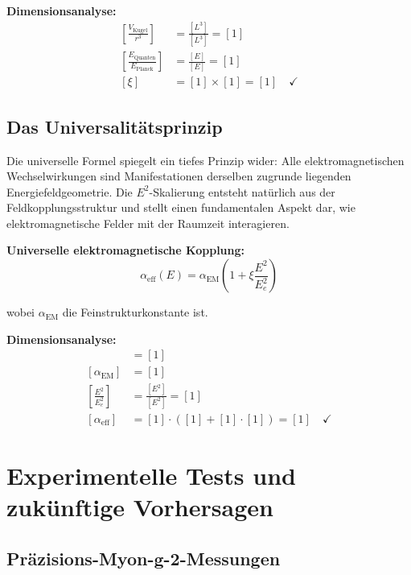 \documentclass[12pt,a4paper]{report}
\begin{document}
	\textbf{Dimensionsanalyse:}
	\begin{align}
		\left[\frac{V_{\text{Kugel}}}{r^3}\right] &= \frac{[L^3]}{[L^3]} = [1] \\
		\left[\frac{E_{\text{Quanten}}}{E_{\text{Planck}}}\right] &= \frac{[E]}{[E]} = [1] \\
		[\xi] &= [1] \times [1] = [1] \quad \checkmark
	\end{align}
	
	\subsection{Das Universalitätsprinzip}
	\label{subsec:universality_principle}
	
	Die universelle Formel spiegelt ein tiefes Prinzip wider: Alle elektromagnetischen Wechselwirkungen sind Manifestationen derselben zugrunde liegenden Energiefeldgeometrie. Die $E^2$-Skalierung entsteht natürlich aus der Feldkopplungsstruktur und stellt einen fundamentalen Aspekt dar, wie elektromagnetische Felder mit der Raumzeit interagieren.
	
	\textbf{Universelle elektromagnetische Kopplung:}
	\begin{equation}
		\alpha_{\text{eff}}(E) = \alpha_{\text{EM}} \left(1 + \xi \frac{E^2}{E_e^2}\right)
	\end{equation}
	
	wobei $\alpha_{\text{EM}}$ die Feinstrukturkonstante ist.
	
	\textbf{Dimensionsanalyse:}
	\begin{align}
		[\alpha_{\text{eff}}] &= [1] \\
		[\alpha_{\text{EM}}] &= [1] \\
		\left[\frac{E^2}{E_e^2}\right] &= \frac{[E^2]}{[E^2]} = [1] \\
		[\alpha_{\text{eff}}] &= [1] \cdot ([1] + [1] \cdot [1]) = [1] \quad \checkmark
	\end{align}
	
	\section{Experimentelle Tests und zukünftige Vorhersagen}
	\label{sec:experimental_tests}
	
	\subsection{Präzisions-Myon-g-2-Messungen}
	\label{subsec:precision_muon_measurements}
	
\end{document}
